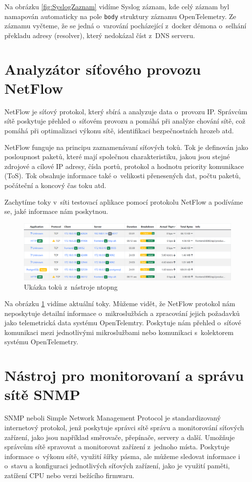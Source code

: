 Na obrázku \ref{fig:SyslogZaznam} vidíme Syslog záznam, kde celý záznam byl namapován automaticky na pole \texttt{body} struktury záznamu OpenTelemetry. Ze záznamu vyčteme, že se jedná o~varování pocházející z~docker démona o~selhání překladu adresy (resolver), který nedokázal číst z~DNS serveru.


\section{Analyzátor síťového provozu NetFlow}

NetFlow \cite{RFC3954} je síťový protokol, který sbírá a analyzuje data o~provozu IP. Správcům sítě poskytuje přehled o~síťovém provozu a pomáhá při analýze chování sítě, což pomáhá při optimalizaci výkonu sítě, identifikaci bezpečnostních hrozeb atd.

NetFlow funguje na principu zaznamenávaní síťových toků. Tok je definován jako posloupnost paketů, které mají společnou charakteristiku, jakou jsou stejné zdrojové a cílové IP adresy, čísla portů, protokol a hodnotu priority komunikace (ToS). Tok obsahuje informace také o~velikosti přenesených dat, počtu paketů, počáteční a koncový čas toku atd.

Zachytíme toky v~síti testovací aplikace pomocí protokolu NetFlow a podíváme se, jaké informace nám poskytnou.

\begin{figure}[H]
  \centering
  \includegraphics[width=15cm]{obrazky-figures/flows.png}
  \caption{Ukázka toků z~nástroje ntopng}
  \label{fig:flow}
\end{figure}

Na obrázku \ref{fig:flow} vidíme aktuální toky. Můžeme vidět, že NetFlow protokol nám neposkytuje detailní informace o~mikroslužbách a zpracování jejich požadavků jako telemetrická data systému OpenTelemtry. Poskytuje nám přehled o~síťové komunikaci mezi jednotlivými mikroslužbami nebo komunikaci s~kolektorem systému OpenTelemetry.

\section{Nástroj pro monitorovaní a správu sítě SNMP}
 SNMP \cite{RFC1157} neboli Simple Network Management Protocol je standardizovaný internetový protokol, jenž poskytuje správci sítě správu a monitorování síťových zařízení, jako jsou například směrovače, přepínače, servery a další. Umožňuje správcům sítě spravovat a monitorovat zařízení z~jednoho místa. Poskytuje informace o~výkonu sítě, využití šířky pásma, ale můžeme sledovat informace i o~stavu a konfiguraci jednotlivých síťových zařízení, jako je využití paměti, zatížení CPU nebo verzi bežícího firmwaru.

